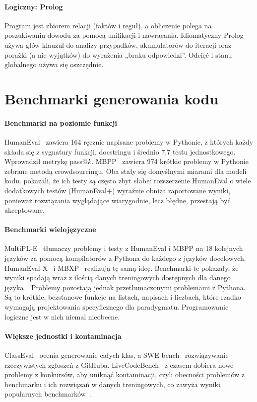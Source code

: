 \paragraph{Logiczny: Prolog} Program jest zbiorem relacji (faktów i reguł), a obliczenie polega na
poszukiwaniu dowodu za pomocą unifikacji i nawracania. Idiomatyczny Prolog używa głów klauzul do
analizy przypadków, akumulatorów do iteracji oraz porażki (a nie wyjątków) do wyrażenia „braku
odpowiedzi”. Odcięć i stanu globalnego używa się oszczędnie.

\section{Benchmarki generowania kodu}
\label{sec:related-benchmarks}

\paragraph{Benchmarki na poziomie funkcji} HumanEval~\cite{chen2021codex} zawiera 164 ręcznie
napisane problemy w Pythonie, z których każdy składa się z sygnatury funkcji, docstringu i średnio
7,7 testu jednostkowego. Wprowadził metrykę pass@$k$. MBPP~\cite{austin2021mbpp} zawiera 974 krótkie
problemy w Pythonie zebrane metodą crowdsourcingu. Oba stały się domyślnymi miarami dla modeli
kodu. \citet{liu2023evalplus} pokazali, że ich testy są często zbyt słabe: rozszerzenie HumanEval
o wiele dodatkowych testów (HumanEval+) wyraźnie obniża raportowane wyniki, ponieważ rozwiązania
wyglądające wiarygodnie, lecz błędne, przestają być akceptowane.

\paragraph{Benchmarki wielojęzyczne} MultiPL-E~\cite{cassano2023multiple} tłumaczy problemy i testy
z HumanEval i MBPP na 18 kolejnych języków za pomocą kompilatorów z Pythona do każdego z języków
docelowych. HumanEval-X~\cite{zheng2023codegeex} i MBXP~\cite{athiwaratkun2023mbxp} realizują tę
samą ideę. Benchmarki te pokazały, że wyniki spadają wraz z ilością danych treningowych dostępnych
dla danego języka~\cite{cassano2023multiple,cassano2024knowledge}. Problemy pozostają jednak
przetłumaczonymi problemami z Pythona. Są to krótkie, bezstanowe funkcje na listach, napisach
i liczbach, które rzadko wymagają projektowania specyficznego dla paradygmatu. Programowanie
logiczne jest w nich niemal nieobecne.

\paragraph{Większe jednostki i kontaminacja} ClassEval~\cite{du2023classeval} ocenia generowanie
całych klas, a SWE-bench~\cite{jimenez2024swebench} rozwiązywanie rzeczywistych zgłoszeń z GitHuba.
LiveCodeBench~\cite{jain2024livecodebench} z czasem dobiera nowe problemy z konkursów, aby uniknąć
kontaminacji, czyli obecności problemów z benchmarku i ich rozwiązań w danych treningowych, co
zawyża wyniki popularnych benchmarków~\cite{riddell2024contamination}.

